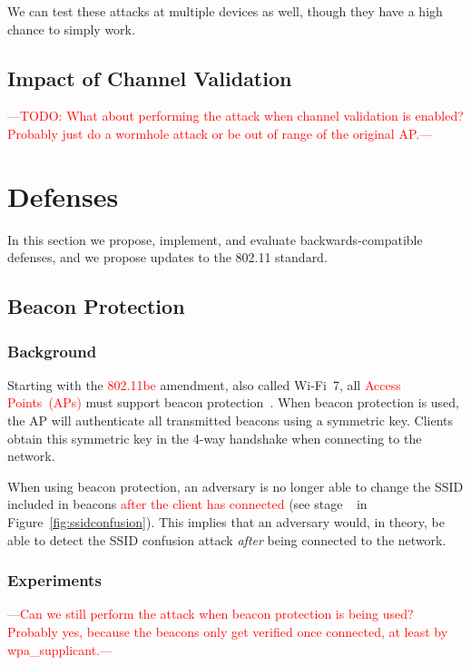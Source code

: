 \documentclass[sigconf,review,anonymous]{acmart}
\newcommand{\circlenum}[1]{\textcircled{\raisebox{-0.90pt}{#1}}}
\newcommand{\wifi}{\mbox{Wi-Fi}}
\newcommand{\fourway}{\mbox{4-way}}
\DeclareRobustCommand{\red}[1]{\textcolor{red}{#1}}
\begin{document}
We can test these attacks at multiple devices as well, though they have a high chance to simply work.


\subsection{Impact of Channel Validation}
\label{sec:ocv}

\red{---TODO: What about performing the attack when channel validation is enabled? Probably just do a wormhole attack or be out of range of the original AP.---}

\section{Defenses}
\label{sec:defenses}

In this section we propose, implement, and evaluate backwards-compatible defenses, and we propose updates to the 802.11 standard.

\subsection{Beacon Protection}

\subsubsection{Background}

Starting with the \red{802.11be} amendment, also called \wifi{}~7, all \red{Access Points~(APs)} must support beacon protection~\cite{ieee-mentor-mandate-beaconprot}.
When beacon protection is used, the AP will authenticate all transmitted beacons using a symmetric key.
Clients obtain this symmetric key in the \fourway{} handshake when connecting to the network.

When using beacon protection, an adversary is no longer able to change the SSID included in beacons \red{after the client has connected} (see stage~\circlenum{3} in Figure~\ref{fig:ssidconfusion}).
This implies that an adversary would, in theory, be able to detect the SSID confusion attack \emph{after} being connected to the network.

\subsubsection{Experiments}

\red{---Can we still perform the attack when beacon protection is being used? Probably yes, because the beacons only get verified once connected, at least by wpa\_supplicant.---}
\end{document}
